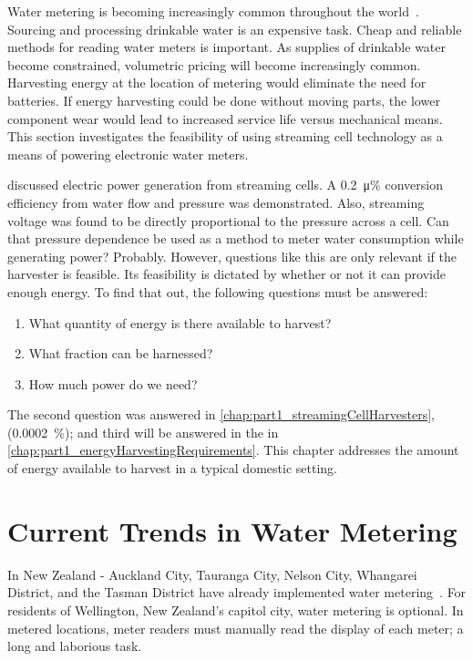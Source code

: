 
Water metering is becoming increasingly common throughout the world~\cite{Chang2012}.
Sourcing and processing drinkable water is an expensive task.
Cheap and reliable methods for reading water meters is important.
As supplies of drinkable water become constrained, volumetric pricing will become increasingly common.
Harvesting energy at the location of metering would eliminate the need for batteries.
If energy harvesting could be done without moving parts, the lower component wear would lead to increased service life versus mechanical means.
This section investigates the feasibility of using streaming cell technology as a means of powering electronic water meters.

 discussed electric power generation from streaming cells.
A \SI{0.2}{\micro\percent} conversion efficiency from water flow and pressure was demonstrated.
Also, streaming voltage was found to be directly proportional to the pressure across a cell.
Can that pressure dependence be used as a method to meter water consumption while generating power? Probably.
However, questions like this are only relevant if the harvester is feasible.
Its feasibility is dictated by whether or not it can provide enough energy.
To find that out, the following questions must be answered:
\begin{enumerate}
  \item What quantity of energy is there available to harvest?
  \item What fraction can be harnessed?
  \item How much power do we need?
\end{enumerate}
The second question was answered in \cref{chap:part1_streamingCellHarvesters}, (\SI{0.0002}{\percent}); and third will be answered in the in \cref{chap:part1_energyHarvestingRequirements}.
This chapter addresses the amount of energy available to harvest in a typical domestic setting.


\section{Current Trends in Water Metering}

  In New Zealand - Auckland City, Tauranga City, Nelson City, Whangarei District, and the Tasman District have already implemented water metering~\cite{WaterNewZealand2011}.
  For residents of Wellington, New Zealand's capitol city, water metering is optional.
  In metered locations, meter readers must manually read the display of each meter; a long and laborious task.

